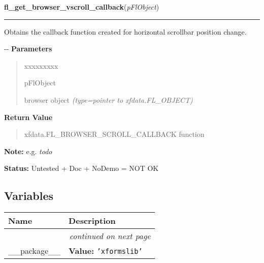\hspace{.8\funcindent}\begin{boxedminipage}{\funcwidth}

    \raggedright \textbf{fl\_get\_browser\_vscroll\_callback}(\textit{pFlObject})

    \vspace{-1.5ex}

    \rule{\textwidth}{0.5\fboxrule}
\setlength{\parskip}{2ex}

Obtains the callback function created for horizontal scrollbar position
change.

-{}-
\setlength{\parskip}{1ex}
      \textbf{Parameters}
      \vspace{-1ex}

      \begin{quote}
        \begin{Ventry}{xxxxxxxxx}

          \item[pFlObject]


browser object
            {\it (type=pointer to xfdata.FL\_OBJECT)}

        \end{Ventry}

      \end{quote}

      \textbf{Return Value}
    \vspace{-1ex}

      \begin{quote}

xfdata.FL\_BROWSER\_SCROLL\_CALLBACK function
      \end{quote}

\textbf{Note:} 
e.g. \emph{todo}


\textbf{Status:} 
Untested + Doc + NoDemo = NOT OK


    \end{boxedminipage}



  \subsection{Variables}

    \vspace{-1cm}
\hspace{\varindent}\begin{longtable}{|p{\varnamewidth}|p{\vardescrwidth}|l}
\cline{1-2}
\cline{1-2} \centering \textbf{Name} & \centering \textbf{Description}& \\
\cline{1-2}
\endhead\cline{1-2}\multicolumn{3}{r}{\small\textit{continued on next page}}\\\endfoot\cline{1-2}
\endlastfoot\raggedright \_\-\_\-p\-a\-c\-k\-a\-g\-e\-\_\-\_\- & \raggedright \textbf{Value:} 
{\tt \texttt{'}\texttt{xformslib}\texttt{'}}&\\
\cline{1-2}
\end{longtable}

